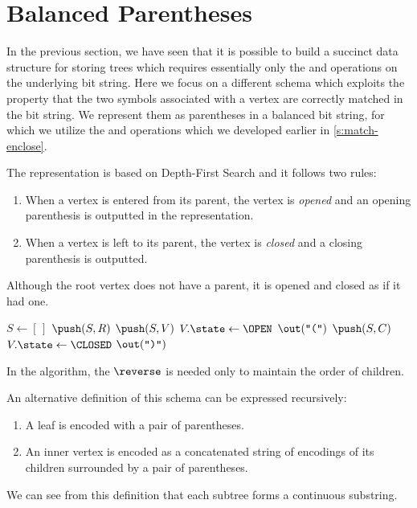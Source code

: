 \section{Balanced Parentheses}

In the previous section, we have seen that it is possible to build a succinct data structure for storing trees which requires essentially only the \rank{} and \select{} operations on the underlying bit string.
Here we focus on a different schema which exploits the property that the two symbols associated with a vertex are correctly matched in the bit string.
We represent them as parentheses in a balanced bit string, for which we utilize the \match{} and \enclose{} operations which we developed earlier in \ref{s:match-enclose}.

The representation is based on Depth-First Search and it follows two rules:
\begin{enumerate}
	\item When a vertex is entered from its parent, the vertex is \emph{opened} and an opening parenthesis is outputted in the representation.
	\item When a vertex is left to its parent, the vertex is \emph{closed} and a closing parenthesis is outputted.
\end{enumerate}
Although the root vertex does not have a parent, it is opened and closed as if it had one.

\begin{algorithm}
\begin{algorithmic}
	\State $S \gets [\,]$%
	\Instr $\push(S, R)$ 
		 
			\State $\push(S, V)$ 
			\State $V.\state \gets \OPEN$
			\State $\out(\openingParen)$
				\State $\push(S, C)$
			\EndFor
		 
			\State $V.\state \gets \CLOSED$
			\State $\out(\closingParen)$
		\EndIf
	\EndWhile
\EndFunction
\end{algorithmic}
\end{algorithm}

In the algorithm, the $\reverse$ is needed only to maintain the order of children.

An alternative definition of this schema can be expressed recursively:
\begin{enumerate}
	\item A leaf is encoded with a pair of parentheses.
	\item An inner vertex is encoded as a concatenated string of encodings of its children surrounded by a pair of parentheses.
\end{enumerate}
We can see from this definition that each subtree forms a continuous substring.

